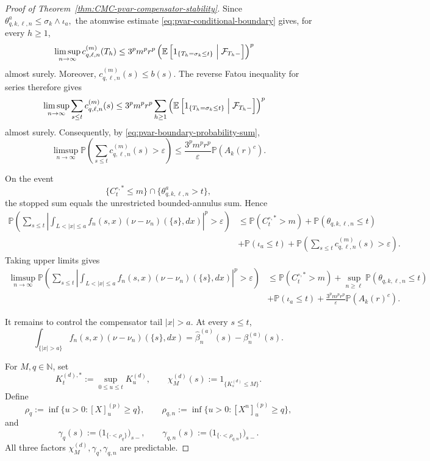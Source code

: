 \documentclass[a4paper,10pt]{article}
\newcommand{\E}{\mathbb E}
\renewcommand{\P}{\mathbb P}
\begin{document}
\begin{proof}[Proof of Theorem~\ref{thm:CMC-pvar-compensator-stability}]
Since
$
        \theta^a_{q,k,\ell,n}
        \le
        \sigma_k\wedge\iota_a,
$
the atomwise estimate \eqref{eq:pvar-conditional-boundary} gives,
for every \(h\ge1\),
\[
\begin{aligned}
\limsup_{n\to\infty}
c_{q,\ell,n}^{(m)}(T_h)
&\le
3^pm^pr^p
\left(
\E\left[
1_{\{T_h=\sigma_k\le t\}}
\Bigm|\mathcal F_{T_h-}
\right]
\right)^p
\end{aligned}
\]
almost surely. Moreover,
$
        c_{q,\ell,n}^{(m)}(s)\le b(s).
$
The reverse Fatou inequality for series therefore gives
\[
\begin{aligned}
\limsup_{n\to\infty}
\sum_{s\le t}c_{q,\ell,n}^{(m)}(s)
&\le
3^pm^pr^p
\sum_{h\ge1}
\left(
\E\left[
1_{\{T_h=\sigma_k\le t\}}
\Bigm|\mathcal F_{T_h-}
\right]
\right)^p
\end{aligned}
\]
almost surely. Consequently, by
\eqref{eq:pvar-boundary-probability-sum},
\[
\limsup_{n\to\infty}
\P\left(
\sum_{s\le t}c_{q,\ell,n}^{(m)}(s)>\varepsilon
\right)
\le
\frac{3^pm^pr^p}{\varepsilon}
\P(A_k(r)^c).
\]

On the event
\[
        \{C_t^{\circ,*}\le m\}
        \cap
        \{\theta^a_{q,k,\ell,n}>t\},
\]
the stopped sum equals the unrestricted bounded-annulus sum. Hence
\begin{align}
\P\left(
\sum_{s\le t}
\left|
\int_{L<|x|\le a}
f_n(s,x)(\nu-\nu_n)(\{s\},dx)
\right|^p
>\varepsilon
\right)
&\le
\P(C_t^{\circ,*}>m)
+
\P(\theta_{q,k,\ell,n}\le t)\nonumber
\\
&+
\P(\iota_a\le t)
+
\P\left(
\sum_{s\le t}c_{q,\ell,n}^{(m)}(s)>\varepsilon
\right).
\label{eq:pvar-bounded-annulus-localization}
\end{align}
Taking upper limits gives
\begin{align}
\limsup_{n\to\infty}
\P\left(
\sum_{s\le t}
\left|
\int_{L<|x|\le a}
f_n(s,x)(\nu-\nu_n)(\{s\},dx)
\right|^p
>\varepsilon
\right)
&\le
\P(C_t^{\circ,*}>m)
+
\sup_{n\ge\ell}
\P(\theta_{q,k,\ell,n}\le t)
\nonumber\\
&+
\P(\iota_a\le t)+
\frac{3^pm^pr^p}{\varepsilon}
\P(A_k(r)^c).
\label{eq:pvar-bounded-annulus-limsup}
\end{align}

It remains to control the compensator tail \(|x|>a\). At every
\(s\le t\),
\[
\int_{\{|x|>a\}}
f_n(s,x)(\nu-\nu_n)(\{s\},dx)
=
\widehat\beta_n^{(a)}(s)-\beta_n^{(a)}(s).
\]

For \(M,q\in\mathbb N\), set
\[
        K_t^{(d),*}
        :=
        \sup_{0\le u\le t}K_u^{(d)},
        \qquad
        \chi_M^{(d)}(s)
        :=
        1_{\{K_s^{(d)}\le M\}}.
\]
Define
\[
\rho_q
:=
\inf\{u>0:[X]^{(p)}_u\ge q\},
\qquad
\rho_{q,n}
:=
\inf\{u>0:[X^n]^{(p)}_u\ge q\},
\]
and
\[
\gamma_q(s)
:=
\bigl(1_{\{\cdot<\rho_q\}}\bigr)_{s-},
\qquad
\gamma_{q,n}(s)
:=
\bigl(1_{\{\cdot<\rho_{q,n}\}}\bigr)_{s-}.
\]
All three factors
\(\chi_M^{(d)},\gamma_q,\gamma_{q,n}\) are predictable.


\end{proof}
\end{document}

